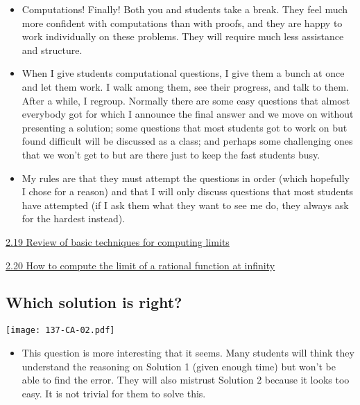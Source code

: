 \documentclass[11pt]{article}
\newcommand{\n}{\newpage}
\newcommand{\nl}{\hfill \vspace{-1.1\baselineskip}} %
\newcommand{\vxix}{\hspace{8mm} \href{https://www.youtube.com/watch?v=8kogZvSk2S4&list=PLlwePzQY_wW8P_I8BFgm0-upywEwTKd8_&index=19}{2.19 Review of basic techniques for computing limits}}
\newcommand{\vxx}{\hspace{8mm} \href{https://www.youtube.com/watch?v=odRR5XVqHe8&list=PLlwePzQY_wW8P_I8BFgm0-upywEwTKd8_&index=20}{2.20 How to compute the limit of a rational function at infinity}}
\begin{document}
\begin{comments}
\nl
	\begin{itemize}
		\item  Computations!   Finally!  Both you and students take a break.  They feel much more confident with computations than with proofs, and they are happy to work individually on these problems.  They will require much less assistance and structure.
		\item When I give students computational questions, I give them a bunch at once and let them work.  I walk among them, see their progress, and talk to them.  After a while, I regroup.  Normally there are some easy questions that almost everybody got for which I announce the final answer and we  move on without presenting a solution;
		some questions that most students got to work on but found difficult will be discussed as a class; and perhaps some challenging ones that we won't get to but are there just to keep the fast students busy.  
		\item My rules are that they must attempt the questions in order (which hopefully I chose for a reason) and that I will only discuss questions that most students have attempted (if I ask them what they want to see me do, they always ask for the hardest instead).
	\end{itemize}
\end{comments}

\begin{videos}
\vxix 

\vxx
\end{videos}

\n
\newpage
\subsection{Which solution is right?} 

\begin{center}
{ \texttt{[image: 137-CA-02.pdf]}}
\end{center}

\begin{comments}
\nl
	\begin{itemize}
		\item This question is more interesting that it seems.  Many students will think they understand the reasoning on Solution 1 (given enough time) but won't be able to find the error.  They will also mistrust Solution 2 because it looks too easy.  It is not trivial for them to solve this.
	\end{itemize}
\end{comments}
\end{document}
